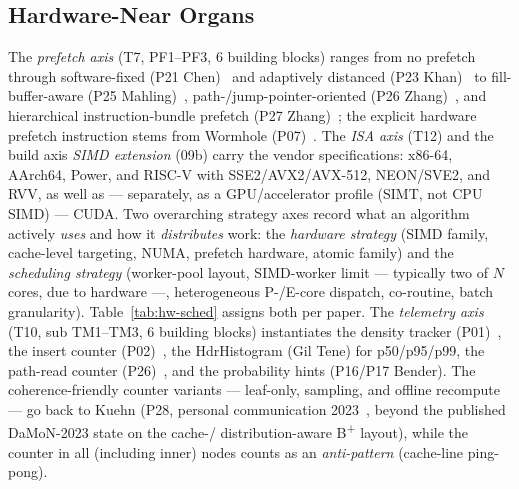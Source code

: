 \subsection{Hardware-Near Organs}\label{ssec:sota-ax-hw}
The \emph{prefetch axis} (T7, PF1--PF3, 6 building blocks) ranges from no prefetch through
software-fixed (P21 Chen)~\cite{chen2001prefetch} and adaptively distanced (P23
Khan)~\cite{khan2010adaptive} to fill-buffer-aware (P25 Mahling)~\cite{mahling2025hotpath},
path-/jump-pointer-oriented (P26 Zhang)~\cite{zhang2024pathprefix}, and hierarchical
instruction-bundle prefetch (P27 Zhang)~\cite{zhang2025hierarchical}; the explicit hardware prefetch
instruction stems from Wormhole (P07)~\cite{wu2019wormhole}. The \emph{ISA axis} (T12) and the build
axis \emph{SIMD extension} (09b) carry the vendor specifications: x86-64, AArch64, Power, and RISC-V
with SSE2/AVX2/AVX-512, NEON/SVE2, and RVV, as well as --- separately, as a GPU/accelerator profile
(SIMT, not CPU SIMD) --- CUDA\@. Two overarching strategy axes record what an algorithm actively
\emph{uses} and how it \emph{distributes} work: the \emph{hardware strategy} (SIMD
family, cache-level targeting, NUMA, prefetch hardware, atomic family) and the
\emph{scheduling strategy} (worker-pool layout, SIMD-worker limit ---
typically two of $N$ cores, due to hardware ---, heterogeneous P-/E-core dispatch,
co-routine, batch granularity). Table~\ref{tab:hw-sched} assigns both per paper. The
\emph{telemetry axis} (T10, sub TM1--TM3, 6 building blocks) instantiates the density tracker
(P01)~\cite{leis2013art}, the insert counter (P02)~\cite{binna2018hot}, the HdrHistogram (Gil Tene)
for p50/p95/p99, the path-read counter (P26)~\cite{zhang2024pathprefix}, and the probability hints
(P16/P17 Bender). The coherence-friendly counter variants --- leaf-only, sampling, and offline
recompute --- go back to Kuehn (P28, personal communication 2023~\cite{kuehn2023bplustree}, beyond
the published DaMoN-2023 state on the cache-/ distribution-aware B\textsuperscript{+} layout), while
the counter in all (including inner) nodes counts as an \emph{anti-pattern} (cache-line ping-pong).


